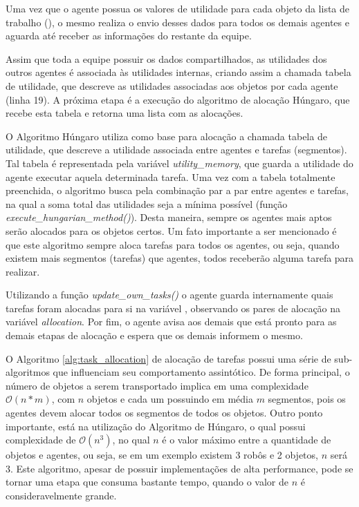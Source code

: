 Uma vez que o agente possua os valores de utilidade para cada objeto da lista de trabalho (\workobjectset), o mesmo realiza o envio desses dados para todos os demais agentes e aguarda até receber as informações do restante da equipe.

Assim que toda a equipe possuir os dados compartilhados, as utilidades dos outros agentes é associada às utilidades internas, criando assim a chamada tabela de utilidade, que descreve as utilidades associadas aos objetos por cada agente (linha 19).
A próxima etapa é a execução do algoritmo de alocação Húngaro, que recebe esta tabela e retorna uma lista com as alocações.

O Algoritmo Húngaro utiliza como base para alocação a chamada tabela de utilidade, que descreve a utilidade associada entre agentes e tarefas (segmentos). Tal tabela é representada pela variável \emph{utility\_memory}, que guarda a utilidade do agente executar aquela determinada tarefa.
Uma vez com a tabela totalmente preenchida, o algoritmo busca pela combinação par a par entre agentes e tarefas, na qual a soma total das utilidades seja a mínima possível (função \emph{execute\_hungarian\_method()}).
Desta maneira, sempre os agentes mais aptos serão alocados para os objetos certos.
Um fato importante a ser mencionado é que este algoritmo sempre aloca tarefas para todos os agentes, ou seja, quando existem mais segmentos (tarefas) que agentes, todos receberão alguma tarefa para realizar.

Utilizando a função \emph{update\_own\_tasks()} o agente guarda internamente quais tarefas foram alocadas para si na variável \tasklist, observando os pares de alocação na variável \emph{allocation}.
Por fim, o agente avisa aos demais que está pronto para as demais etapas de alocação e espera que os demais informem o mesmo.

O Algoritmo \ref{alg:task_allocation} de alocação de tarefas possui uma série de sub-algoritmos que influenciam seu comportamento assintótico. De forma principal, o número de objetos a serem transportado implica em uma complexidade $\mathcal{O}(n * m)$, com $n$ objetos e cada um possuindo em média $m$ segmentos, pois os agentes devem alocar todos os segmentos de todos os objetos.
Outro ponto importante, está na utilização do Algoritmo de Húngaro, o qual possui complexidade de $\mathcal{O}(n^3)$, no qual $n$ é o valor máximo entre a quantidade de objetos e agentes, ou seja, se em um exemplo existem 3 robôs e 2 objetos, $n$ será 3.
Este algoritmo, apesar de possuir implementações de alta performance, pode se tornar uma etapa que consuma bastante tempo, quando o valor de $n$ é consideravelmente grande.

